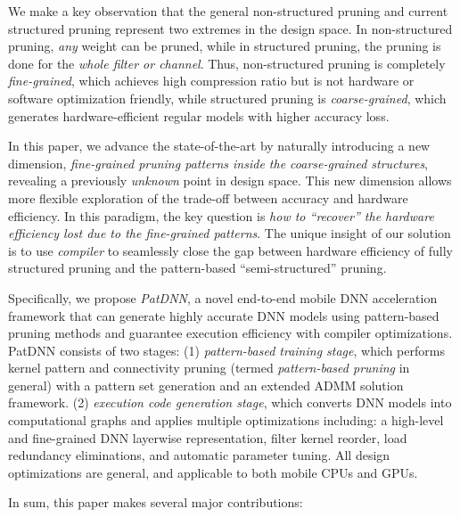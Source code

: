 \documentclass[sigplan,screen]{acmart}
\newcommand{\projectname}{PatDNN\xspace}
\begin{document}
We make a key observation 
that the general non-structured pruning
and current structured pruning 
represent two extremes in the design space.
In non-structured pruning, {\em any} weight can be 
pruned, while in structured pruning, the pruning 
is done for
the {\em whole filter or channel}.
Thus, non-structured pruning is 
completely {\em fine-grained}, which achieves
high compression ratio but is not hardware or 
software optimization friendly,
while structured pruning is {\em coarse-grained},
which generates hardware-efficient regular models
with higher accuracy loss. 

In this paper, we advance the state-of-the-art
by naturally introducing a new dimension,
{\em fine-grained 
pruning patterns inside the coarse-grained
structures}, revealing a previously {\em unknown}
point in design space. 
This new dimension allows more flexible
exploration of the trade-off between 
accuracy and hardware efficiency. 
In this paradigm, the key question is 
{\em how to ``recover'' the hardware efficiency
lost due to the fine-grained patterns}.
The unique insight of our solution is 
to use {\em compiler} to seamlessly 
close the gap between hardware efficiency
of fully structured pruning and the 
pattern-based ``semi-structured'' pruning.

Specifically, we propose
{\em \projectname}, a novel end-to-end mobile DNN acceleration framework that can generate highly accurate
DNN models using pattern-based pruning methods
and guarantee execution efficiency with 
compiler optimizations.
\projectname consists of two stages: (1) \emph{pattern-based training stage}, which performs kernel pattern and connectivity pruning (termed \emph{pattern-based pruning} in general) with a pattern set generation and an extended ADMM solution framework. (2) \emph{execution code generation stage}, which converts DNN models into computational graphs and applies multiple optimizations including: a high-level and fine-grained DNN layerwise representation, filter kernel reorder, load redundancy eliminations, and automatic parameter tuning. All design optimizations are general, and applicable to both mobile CPUs and GPUs. 




In sum, this paper makes several major contributions:
\end{document}
